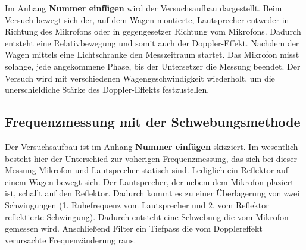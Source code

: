Im Anhang \textbf{Nummer einfügen} wird der Versuchsaufbau dargestellt.
Beim Versuch bewegt sich der, auf dem Wagen montierte, Lautsprecher entweder
in Richtung des Mikrofons oder in gegengesetzer Richtung vom Mikrofons.
Dadurch entsteht eine Relativbewegung und somit auch der
Doppler-Effekt.
Nachdem der Wagen mittels eine Lichtschranke den Messzeitraum startet.
Das Mikrofon misst solange, jede angekommene Phase, bis der Untersetzer
die Messung beendet.
Der Versuch wird mit verschiedenen Wagengeschwindigkeit
wiederholt, um die unerschieldiche Stärke des Doppler-Effekts
festzustellen.

\subsection{Frequenzmessung mit der Schwebungsmethode}

Der Versuchsaufbau ist im Anhang \textbf{Nummer einfügen}
skizziert.
Im wesentlich besteht hier der Unterschied zur voherigen
Frequenzmessung, das sich bei dieser Messung Mikrofon und
Lautsprecher statisch sind.
Lediglich ein Reflektor auf einem Wagen bewegt sich.
Der Lautsprecher, der nebem dem Mikrofon plaziert ist, schallt auf
den Reflektor. Dadurch kommt es zu einer Überlagerung von zwei Schwingungen
(1. Ruhefrequenz vom Lautsprecher und 2. vom Reflektor reflektierte Schwingung).
Dadurch entsteht eine Schwebung die vom Mikrofon gemessen wird.
Anschließend Filter ein Tiefpass die vom Dopplereffekt verursachte
Frequenzänderung raus.




\printbibliography
\printindex
